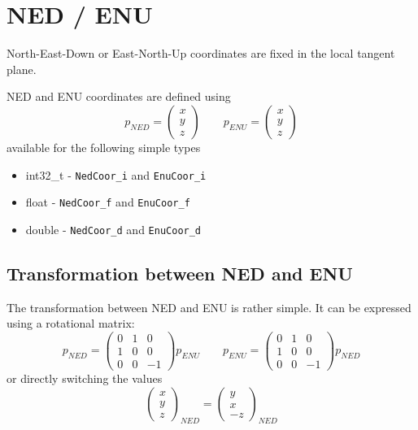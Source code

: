 \section{NED / ENU}
North-East-Down or East-North-Up coordinates are fixed in the local tangent plane. 

NED and ENU coordinates are defined using
\begin{equation}
p_{NED} = \begin{pmatrix} x \\ y \\ z \end{pmatrix} \qquad
p_{ENU} = \begin{pmatrix} x \\ y \\ z \end{pmatrix}
\end{equation}
available for the following simple types
\begin{itemize}
\item int32\_t - \texttt{NedCoor\_i} and \texttt{EnuCoor\_i}
\item float - \texttt{NedCoor\_f} and \texttt{EnuCoor\_f}
\item double - \texttt{NedCoor\_d} and \texttt{EnuCoor\_d}
\end{itemize}

\subsection{Transformation between NED and ENU}
The transformation between NED and ENU is rather simple. It can be expressed using a rotational matrix:
\begin{equation}
p_{NED} = \begin{pmatrix}
0 & 1 &  0 \\
1 & 0 &  0 \\
0 & 0 & -1
\end{pmatrix}
p_{ENU} \qquad p_{ENU} = \begin{pmatrix}
0 & 1 &  0 \\
1 & 0 &  0 \\
0 & 0 & -1
\end{pmatrix} p_{NED}
\end{equation}
or directly switching the values
\begin{equation}
\begin{pmatrix}x \\ y \\  z \end{pmatrix}_{NED} = 
\begin{pmatrix}y \\ x \\ -z \end{pmatrix}_{NED}
\end{equation}



